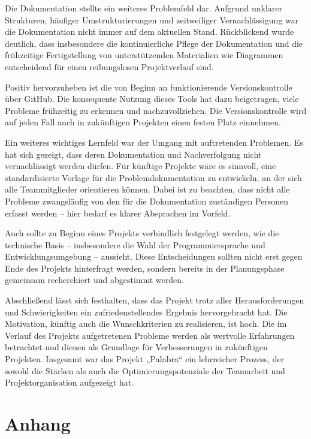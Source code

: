 \documentclass[12pt,a4paper]{article}
\begin{document}
Die Dokumentation stellte ein weiteres Problemfeld dar. Aufgrund unklarer Strukturen, häufiger Umstrukturierungen und zeitweiliger Vernachlässigung war die Dokumentation nicht immer auf dem aktuellen Stand. Rückblickend wurde deutlich, dass insbesondere die kontinuierliche Pflege der Dokumentation und die frühzeitige Fertigstellung von unterstützenden Materialien wie Diagrammen entscheidend für einen reibungslosen Projektverlauf sind.

Positiv hervorzuheben ist die von Beginn an funktionierende Versionskontrolle über GitHub. Die konsequente Nutzung dieses Tools hat dazu beigetragen, viele Probleme frühzeitig zu erkennen und nachzuvollziehen. Die Versionskontrolle wird auf jeden Fall auch in zukünftigen Projekten einen festen Platz einnehmen.

Ein weiteres wichtiges Lernfeld war der Umgang mit auftretenden Problemen. Es hat sich gezeigt, dass deren Dokumentation und Nachverfolgung nicht vernachlässigt werden dürfen. Für künftige Projekte wäre es sinnvoll, eine standardisierte Vorlage für die Problemdokumentation zu entwickeln, an der sich alle Teammitglieder orientieren können. Dabei ist zu beachten, dass nicht alle Probleme zwangsläufig von den für die Dokumentation zuständigen Personen erfasst werden – hier bedarf es klarer Absprachen im Vorfeld.

Auch sollte zu Beginn eines Projekts verbindlich festgelegt werden, wie die technische Basis – insbesondere die Wahl der Programmiersprache und Entwicklungsumgebung – aussieht. Diese Entscheidungen sollten nicht erst gegen Ende des Projekts hinterfragt werden, sondern bereits in der Planungsphase gemeinsam recherchiert und abgestimmt werden.

Abschließend lässt sich festhalten, dass das Projekt trotz aller Herausforderungen und Schwierigkeiten ein zufriedenstellendes Ergebnis hervorgebracht hat. Die Motivation, künftig auch die Wunschkriterien zu realisieren, ist hoch. Die im Verlauf des Projekts aufgetretenen Probleme werden als wertvolle Erfahrungen betrachtet und dienen als Grundlage für Verbesserungen in zukünftigen Projekten. Insgesamt war das Projekt „Palabra“ ein lehrreicher Prozess, der sowohl die Stärken als auch die Optimierungspotenziale der Teamarbeit und Projektorganisation aufgezeigt hat.


\appendix
\section{Anhang}
\end{document}
